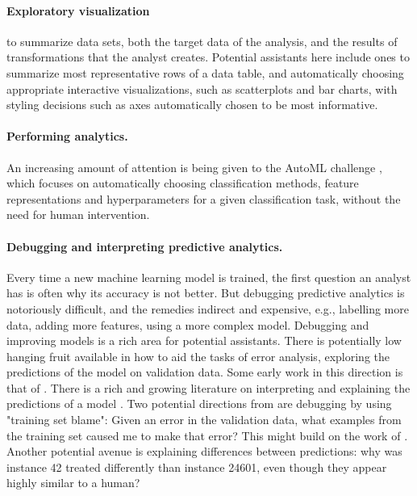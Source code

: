 \documentclass[sigplan,preprint,10pt]{acmart}\settopmatter{printfolios=true,printccs=false,printacmref=false}
\begin{document}
{{\paragraph{Exploratory visualization} to summarize
data sets, both the target data of the analysis,
and the results of transformations that the analyst
creates. Potential assistants here include ones
to summarize most representative rows of a data table,
and automatically choosing appropriate interactive
visualizations, such as scatterplots and bar charts,
with styling decisions such as axes automatically
chosen to be most informative.

\paragraph{Performing analytics.}
An increasing amount of attention is being
given to the AutoML challenge \cite{guyon_review_2016}, which focuses
on automatically choosing classification
methods, feature representations and hyperparameters
for a given classification task, without the need for human intervention.

\paragraph{Debugging and interpreting predictive analytics.}
Every time a new machine learning model is trained, the first question
an analyst has is often why its accuracy is not better. But debugging
predictive analytics is notoriously difficult, and the remedies
indirect and expensive, e.g., labelling more data, adding more
features, using a more complex model. Debugging and improving models
is a rich area for potential assistants.  There is potentially low
hanging fruit available in how to aid the tasks of error analysis,
exploring the predictions of the model on validation data. Some early
work in this direction is that of \citet{ren2016squares}.  There is a rich and growing
literature on interpreting and explaining the predictions of a model
\cite{lipton:mythos,doshi-velez17,Ribeiro2016lime,darksight}.  Two
potential directions from are debugging by using "training set
blame": Given an error in the validation data, what examples from the
training set caused me to make that error? This might build on the
work of \citet{koh2017understanding}.  Another potential avenue is explaining
differences between predictions: why was instance 42 treated
differently than instance 24601, even though they appear highly
similar to a human?  }

}
\end{document}
